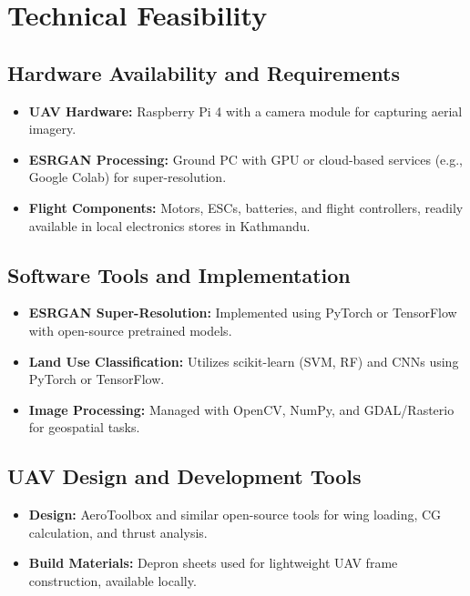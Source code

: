 \section{Technical Feasibility}

\subsection{Hardware Availability and Requirements}
\begin{itemize}
  \item \textbf{UAV Hardware:} Raspberry Pi 4 with a camera module for capturing aerial imagery.
  \item \textbf{ESRGAN Processing:} Ground PC with GPU or cloud-based services (e.g., Google Colab) for super-resolution.
  \item \textbf{Flight Components:} Motors, ESCs, batteries, and flight controllers, readily available in local electronics stores in Kathmandu.
\end{itemize}

\subsection{Software Tools and Implementation}
\begin{itemize}
  \item \textbf{ESRGAN Super-Resolution:} Implemented using PyTorch or TensorFlow with open-source pretrained models.
  \item \textbf{Land Use Classification:} Utilizes scikit-learn (SVM, RF) and CNNs using PyTorch or TensorFlow.
  \item \textbf{Image Processing:} Managed with OpenCV, NumPy, and GDAL/Rasterio for geospatial tasks.
\end{itemize}

\subsection{UAV Design and Development Tools}
\begin{itemize}
  \item \textbf{Design:} AeroToolbox and similar open-source tools for wing loading, CG calculation, and thrust analysis.
  \item \textbf{Build Materials:} Depron sheets used for lightweight UAV frame construction, available locally.
\end{itemize}

